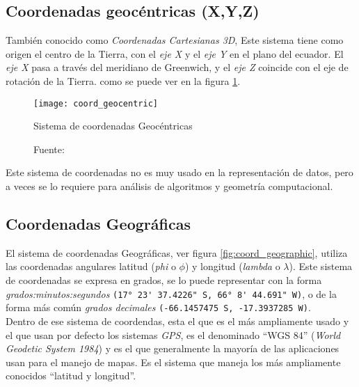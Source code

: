     \subsection{Coordenadas geocéntricas (X,Y,Z)} %
      \label{sub:coordenadas_geocentricas}
        También conocido como \emph{Coordenadas Cartesianas 3D}, Este sistema tiene como origen el centro de la Tierra, con el \emph{eje X} y el \emph{eje Y} en el plano del ecuador. El \emph{eje X} pasa a través del meridiano de Greenwich, y el \emph{eje Z}  coincide con el eje de rotación de la Tierra. como se puede ver en la figura \ref{fig:coord_geocentric}.

        \begin{figure}[H]
          \begin{center}
            \texttt{[image: coord\_geocentric]}
            \caption{Sistema de coordenadas Geocéntricas}
            \label{fig:coord_geocentric}
            \caption*{Fuente: \cite{coords2009} }
          \end{center}
        \end{figure}

        Este sistema de coordenadas no es muy usado en la representación de datos, pero a veces se lo requiere para análisis de algoritmos y geometría computacional.

      \subsection{Coordenadas Geográficas} %
      \label{sub:coordenadas_geograficas}
        El sistema de coordenadas Geográficas, ver figura \ref{fig:coord_geographic}, utiliza las coordenadas angulares latitud  (\emph{phi} o ${\phi}$) y longitud (\emph{lambda} o ${\lambda}$). Este sistema de coordenadas se expresa en grados, se lo puede representar con la forma \emph{grados:minutos:segundos }\verb|(17° 23' 37.4226" S, 66° 8' 44.691" W)|, o de la forma más común \emph{grados decimales} \verb|(-66.1457475 S, -17.3937285 W)|. \\

  Dentro de ese sistema de coordendas, esta el que es el más ampliamente usado y el que usan por defecto los sistemas \emph{GPS}, es el denominado ``WGS 84'' (\emph{World Geodetic System 1984}) y es el que generalmente la mayoría de las aplicaciones usan para el manejo de mapas. Es el sistema que maneja los más ampliamente conocidos ``latitud y longitud''.\\

